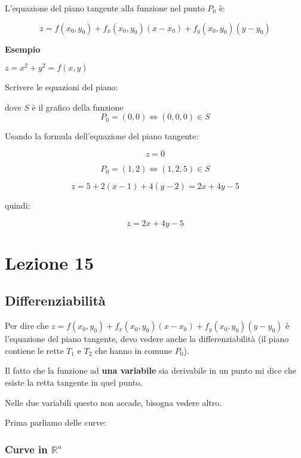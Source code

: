 \documentclass[11pt]{article}
\begin{document}
L'equazione del piano tangente alla funzione nel punto $P_0$ è:

\[
    z = f(x_0,y_0) + f_x(x_0,y_0) (x-x_0) + f_y(x_0,y_0) (y-y_0) 
\]


\textbf{Esempio} 

$z= x^{2}+y^{2}= f(x,y)$

Scrivere le equazioni del piano:

dove $S$ è il grafico della funzione
\[
    P_0=(0,0) \Leftrightarrow (0,0,0) \in S
\]

Usando la formula dell'equazione del piano tangente:

\[
    z=0
\]


\[
    P_0=(1,2) \Leftrightarrow (1,2,5) \in S
\]

\[
    z= 5+ 2(x-1) + 4(y-2) = 2x+4y -5
\]

quindi:

\[
    z = 2x+4y-5
\]

\newpage

\section{Lezione 15}

\subsection{Differenziabilità}

Per dire che $z = f(x_0,y_0) + f_x(x_0,y_0) (x-x_0) + f_y(x_0,y_0) (y-y_0) $ è l'equazione del piano tangente, devo vedere anche la differenziabilità (il piano contiene le rette $T_1$ e $T_2$ che hanno in comune $P_0$).


Il fatto che la funzione ad \textbf{una variabile} sia derivabile in un punto mi dice che esiste la retta tangente in quel punto.


Nelle due variabili questo non accade, bisogna vedere altro.

Prima parliamo delle curve:

\subsubsection{Curve in $\mathbb{R}^{n}$}
\end{document}
